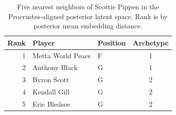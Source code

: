 \begin{table}[htbp]
  \centering\small
  \begin{tabular}{rllc}
    \toprule
    Rank & Player & Position & Archetype \\
    \midrule
    1 & Metta World Peace & F & 1 \\
    2 & Anthony Black & G & 1 \\
    3 & Byron Scott & G & 2 \\
    4 & Kendall Gill & G & 2 \\
    5 & Eric Bledsoe & G & 2 \\
    \bottomrule
  \end{tabular}
  \caption{Five nearest neighbors of Scottie Pippen in the Procrustes-aligned posterior latent space. Rank is by posterior mean embedding distance.}
  \label{tab:Scottie_Pippen_neighbors}
\end{table}


